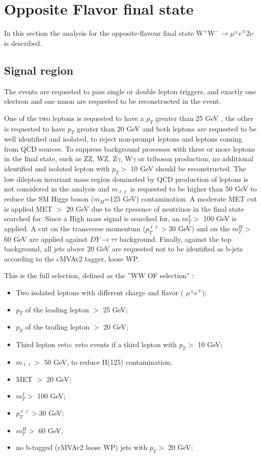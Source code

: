 \section{Opposite Flavor final state}\label{sec:OF}
In this section the analysis for the opposite-flavour final state
$\mathrm{W^+W^-}\to \mu^{\pm} e^{\mp}  2\nu$ is described. \\

\subsection{Signal region}

The events are requested to pass single or double lepton triggers, and exactly one electron and
one muon are requested to be reconstructed in the event. 

One of the two leptons is requested to have a $p_T$ greater than 25 GeV , the other is
requested to have  $p_T$ greater than 20 GeV and both leptons are requested to be well identified
and isolated, to reject non-prompt leptons and leptons coming from QCD sources. To suppress
background processes with three or more leptons in the final state, such as ZZ, WZ, Z$\gamma$, W$\gamma$
or triboson production, no additional identified and isolated lepton with $p_T >$  10 GeV should
be reconstructed. The low dilepton invariant mass region dominated by QCD production of
leptons is not considered in the analysis and $m_{\ell \ell}$  is requested to
be higher than 50 GeV to reduce the SM Higgs boson ($m_H$=125 GeV)
contamination. A moderate MET cut is applied MET $>$ 20 GeV due to the
rpesence of neutrinos in the final state searched for. Since a High mass
signal is searched for, an $m_T^I >$ 100 GeV is applied.
A cut on the transverse momentum ($p_T^{\ell \ell} >$30 GeV) and on the $m_T^H
>$ 60 GeV are applied against $DY\rightarrow{}\tau\tau$ background. 
Finally, against the top background, all jets above 20 GeV are requested not
to be identified as b-jets according to the cMVAv2 tagger, loose WP.

This is the full selection, defined as the ''WW OF selection'' :

\begin{itemize}
\item Two isolated leptons with different charge and flavor ( $\mu^{\pm}
e^{\mp}$);
\item $p_T$ of the leading lepton $>$ 25 GeV;
\item $p_T$ of the trailing lepton $>$ 20 GeV;
\item Third lepton veto: veto events if a third lepton with $p_T  >$ 10 GeV;
\item  $m_{\ell \ell} >$ 50 GeV, to reduce H(125) contamination;
\item MET $>$ 20 GeV;
\item $m_T^I >$ 100 GeV;
\item $p_T^{\ell \ell} >$30 GeV;
\item  $m_T^H >$ 60 GeV;
\item  no b-tagged (cMVAv2 loose WP) jets with $p_T >$  20 GeV;
\end{itemize}


